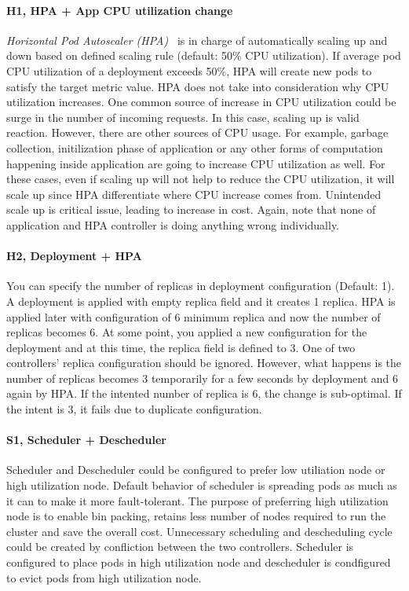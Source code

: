 \paragraph*{H1, HPA + App CPU utilization change}
\textit{Horizontal Pod Autoscaler (HPA)}~\cite{hpa} is in charge of automatically scaling up and down based on defined scaling rule (default: 50\% CPU utilization). If average pod CPU utilization of a deployment exceeds 50\%, HPA will create new pods to satisfy the target metric value. 
HPA does not take into consideration why CPU utilization increases. One common source of increase in CPU utilization could be surge in the number of incoming requests. In this case, scaling up is valid reaction. However, there are other sources of CPU usage. For example, garbage collection, initilization phase of application or any other forms of computation happening inside application are going to increase CPU utilization as well. For these cases, even if scaling up will not help to reduce the CPU utilization, it will scale up since HPA differentiate where CPU increase comes from. Unintended scale up is critical issue, leading to increase in cost. Again, note that none of application and HPA controller is doing anything wrong individually.

\paragraph*{H2, Deployment + HPA}
You can specify the number of replicas in deployment configuration (Default: 1). A deployment is applied with empty replica field and it creates 1 replica. HPA is applied later with configuration of 6 minimum replica and now the number of replicas becomes 6. At some point, you applied a new configuration for the deployment and at this time, the replica field is defined to 3. One of two controllers' replica configuration should be ignored. However, what happens is the number of replicas becomes 3 temporarily for a few seconds by deployment and 6 again by HPA. If the intented number of replica is 6, the change is sub-optimal. If the intent is 3, it fails due to duplicate configuration.


\paragraph*{S1, Scheduler + Descheduler}
Scheduler and Descheduler could be configured to prefer low utiliation node or high utilization node. Default behavior of scheduler is spreading pods as much as it can to make it more fault-tolerant. The purpose of preferring high utilization node is to enable bin packing, retains less number of nodes required to run the cluster and save the overall cost. Unnecessary scheduling and descheduling cycle could be created by confliction between the two controllers. Scheduler is configured to place pods in high utilization node and descheduler is condfigured to evict pods from high utilization node. 

